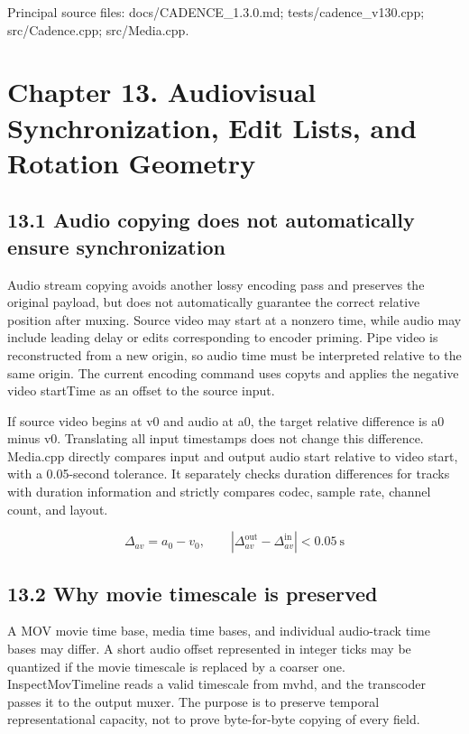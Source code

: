 \documentclass[11pt,a4paper,openany]{book}
\begin{document}
\par\small Principal source files: docs/CADENCE\_1.3.0.md; tests/cadence\_v130.cpp; src/Cadence.cpp; src/Media.cpp.\normalsize

\chapter*{Chapter 13. Audiovisual Synchronization, Edit Lists, and Rotation Geometry}

\section*{13.1 Audio copying does not automatically ensure synchronization}
Audio stream copying avoids another lossy encoding pass and preserves the original payload, but does not automatically guarantee the correct relative position after muxing. Source video may start at a nonzero time, while audio may include leading delay or edits corresponding to encoder priming. Pipe video is reconstructed from a new origin, so audio time must be interpreted relative to the same origin. The current encoding command uses copyts and applies the negative video startTime as an offset to the source input.

If source video begins at v0 and audio at a0, the target relative difference is a0 minus v0. Translating all input timestamps does not change this difference. Media.cpp directly compares input and output audio start relative to video start, with a 0.05-second tolerance. It separately checks duration differences for tracks with duration information and strictly compares codec, sample rate, channel count, and layout.


\begin{equation}
\Delta_{av}=a_0-v_0,\qquad |\Delta_{av}^{\mathrm{out}}-\Delta_{av}^{\mathrm{in}}|<0.05\ \mathrm{s}
\end{equation}

\section*{13.2 Why movie timescale is preserved}
A MOV movie time base, media time bases, and individual audio-track time bases may differ. A short audio offset represented in integer ticks may be quantized if the movie timescale is replaced by a coarser one. InspectMovTimeline reads a valid timescale from mvhd, and the transcoder passes it to the output muxer. The purpose is to preserve temporal representational capacity, not to prove byte-for-byte copying of every field.
\end{document}
